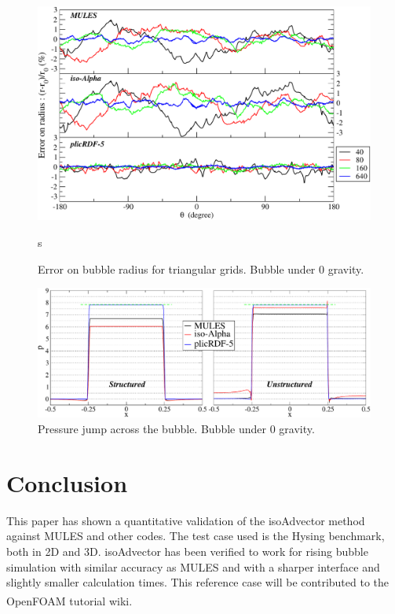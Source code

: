 \documentclass[review]{elsarticle}
\begin{document}
\begin{figure}[!h]
  \includegraphics[width=\textwidth]{figures/spuriousCurrents_bubble_error_radius_uns.pdf}
  \caption{Error on bubble radius for triangular grids. Bubble under 0 gravity.}s
  \label{fig:spuriousCurrents_bubble_error_radius_uns}
\end{figure}

\begin{figure}[!h]
  \includegraphics[width=\textwidth]{figures/spuriousCurrents_pressure_drop_t=3_160x320.pdf}
  \caption{Pressure jump across the bubble. Bubble under 0 gravity.}
  \label{fig:spuriousCurrents_pressure_jump}
\end{figure}



\section{\small Conclusion}
This paper has shown a quantitative validation of the isoAdvector method against MULES and other 
codes. The test case used is the Hysing benchmark, both in 2D and 3D. isoAdvector has been verified to work for rising bubble simulation with similar accuracy as MULES and with a sharper interface and slightly smaller calculation times.
This reference case will be contributed to the OpenFOAM\textsuperscript{\textregistered} tutorial wiki.
\end{document}
